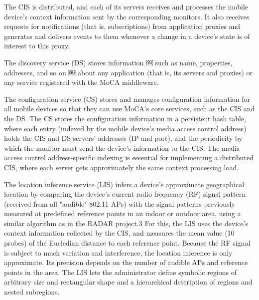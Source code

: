 \documentclass[twocolumn]{article}
\begin{document}
The CIS is distributed, and each of its servers receives and processes the mobile device's context information sent by the corresponding monitors. It also receives requests for notifications (that is, subscriptions) from application proxies and generates and delivers events to them whenever a change in a device's state is of interest to this proxy.

The discovery service (DS) stores information ￼ such as name, properties, addresses, and so on ￼ about any application (that is, its servers and proxies) or any service registered with the MoCA middleware.

The configuration service (CS) stores and manages configuration information for all mobile devices so that they can use MoCA's core services, such as the CIS and the DS. The CS stores the configuration information in a persistent hash table, where each entry (indexed by the mobile device's media access control address) holds the CIS and DS servers' addresses (IP and port), and the periodicity by which the monitor must send the device's information to the CIS. The media access control address-specific indexing is essential for implementing a distributed CIS, where each server gets approximately the same context processing load.

The location inference service (LIS) infers a device's approximate geographical location by comparing the device's current radio frequency (RF) signal pattern (received from all "audible" 802.11 APs) with the signal patterns previously measured at predefined reference points in an indoor or outdoor area, using a similar algorithm as in the RADAR project.3 For this, the LIS uses the device's context information collected by the CIS, and measures the mean value (10 probes) of the Eucledian distance to each reference point. Because the RF signal is subject to much variation and interference, the location inference is only approximate. Its precision depends on the number of audible APs and reference points in the area. The LIS lets the administrator define symbolic regions of arbitrary size and rectangular shape and a hierarchical description of regions and nested subregions.


\end{document}
